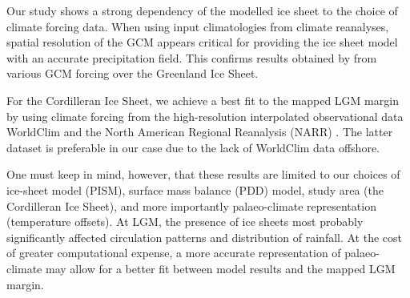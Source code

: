 \conclusions
\label{sec:concl}

Our study shows a strong dependency of the modelled ice sheet to the choice of climate forcing data. When using input climatologies from climate reanalyses, spatial resolution of the GCM appears critical for providing the ice sheet model with an accurate precipitation field. This confirms results obtained by \citet{quiquet-etal-2012} from various GCM forcing over the Greenland Ice Sheet.

For the Cordilleran Ice Sheet, we achieve a best fit to the mapped LGM margin by \citet{dyke-2004} using climate forcing from the high-resolution interpolated observational data WorldClim \citep{data:worldclim} and the North American Regional Reanalysis (NARR) \citep{data:narr}. The latter dataset is preferable in our case due to the lack of WorldClim data offshore.

One must keep in mind, however, that these results are limited to our choices of ice-sheet model (PISM), surface mass balance (PDD) model, study area (the Cordilleran Ice Sheet), and more importantly palaeo-climate representation (temperature offsets). At LGM, the presence of ice sheets most probably significantly affected circulation patterns and distribution of rainfall. At the cost of greater computational expense, a more accurate representation of palaeo-climate may allow for a better fit between model results and the mapped LGM margin.
